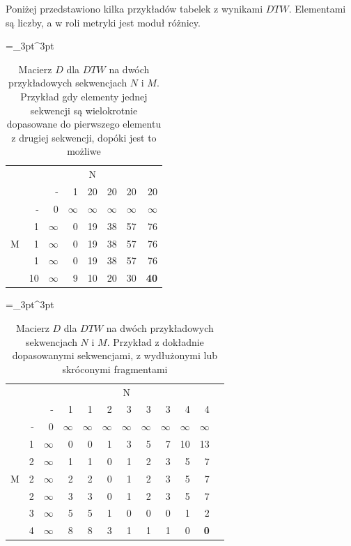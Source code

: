Poniżej przedstawiono kilka przykładów tabelek z wynikami $DTW$. Elementami są liczby, a w roli metryki jest moduł różnicy.

\begin{table}[H]
    \caption{Macierz $D$ dla $DTW$ na dwóch przykładowych sekwencjach $N$ i $M$. Przykład gdy elementy jednej sekwencji są wielokrotnie dopasowane do pierwszego elementu z drugiej sekwencji, dopóki jest to możliwe}
    \centering
    \label{tab:dtw_example0}
    \small
    \tabulinesep =_3pt^3pt
    \begin{tabu}{r*{7}{r}}
         & & 
        \\
        & & - & 1 & 20 & 20 & 20 & 20
        \\ \midrule
         & - & 0 & $\infty$ & $\infty$ & $\infty$ & $\infty$ & $\infty$
        \\
        & 1 & $\infty$ & 0 & 19 & 38 & 57 & 76
        \\
        & 1 & $\infty$ & 0 & 19 & 38 & 57 & 76
        \\
        & 1 & $\infty$ & 0 & 19 & 38 & 57 & 76
        \\
        & 10 & $\infty$ & 9 & 10 & 20 & 30 & \textbf{40}
        \\
    \end{tabu}
\end{table}

\begin{table}[H]
    \caption{Macierz $D$ dla $DTW$ na dwóch przykładowych sekwencjach $N$ i $M$. Przykład z dokładnie dopasowanymi sekwencjami, z wydłużonymi lub skróconymi fragmentami}
    \centering
    \label{tab:dtw_example1}
    \small
    \tabulinesep =_3pt^3pt
    \begin{tabu}{r*{11}{r}}
         & & 
        \\
        & & - & 1 & 1 & 2 & 3 & 3 & 3 & 4 & 4
        \\ \midrule
         & - & 0 & $\infty$ & $\infty$ & $\infty$ & $\infty$ & $\infty$ & $\infty$ & $\infty$ & $\infty$
        \\
        & 1 & $\infty$ & 0 & 0 & 1 & 3 & 5 & 7 & 10 & 13
        \\
        & 2 & $\infty$ & 1 & 1 & 0 & 1 & 2 & 3 & 5 & 7
        \\
        & 2 & $\infty$ & 2 & 2 & 0 & 1 & 2 & 3 & 5 & 7
        \\
        & 2 & $\infty$ & 3 & 3 & 0 & 1 & 2 & 3 & 5 & 7
        \\
        & 3 & $\infty$ & 5 & 5 & 1 & 0 & 0 & 0 & 1 & 2
        \\
        & 4 & $\infty$ & 8 & 8 & 3 & 1 & 1 & 1 & 0 & \textbf{0}
        \\
    \end{tabu}
\end{table}

